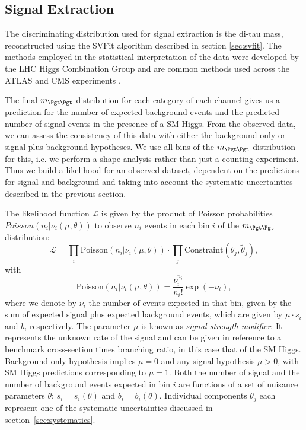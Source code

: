 \subsection{Signal Extraction}
\label{sec:signalextraction}

The discriminating distribution used for signal extraction is the di-tau mass,
reconstructed using the SVFit algorithm described in section \ref{sec:svfit}. 
The methods employed in the statistical
interpretation of the data were developed by the LHC Higgs Combination Group and
are common methods used across the ATLAS and CMS experiments \cite{LHC-HCG-Report}.

The final $m_{\Pgt\Pgt}$ distribution for each category of each channel gives
us a prediction for the number of expected background events and the predicted number of signal
events in the presence of a \ac{SM} Higgs. From the observed data, we can assess
the consistency of this data with either the background only or
signal-plus-background hypotheses. We use all bins of the $m_{\Pgt\Pgt}$
distribution for this, i.e. we perform a shape analysis rather than just a
counting experiment. Thus we build a likelihood for an observed dataset,
dependent on the predictions for signal and background and taking into account
the systematic uncertainties described in the previous section.

The likelihood function $\mathcal{L}$ is given by the product of Poisson probabilities 
$Poisson(n_{i} \vert \nu_{i}(\mu, \theta))$ to observe $n_{i}$ events in each bin
$i$ of the $m_{\Pgt\Pgt}$ distribution:
\begin{equation}
\mathcal{L} = \prod_{i} \mathrm{Poisson}(n_{i} \vert \nu_{i}(\mu, \theta)) \cdot
\prod_{j} \mathrm{Constraint}(\theta_{j}, \tilde{\theta}_{j}),
\label{eq:LikelihoodFunction}
\end{equation}
with
\begin{equation}
\mathrm{Poisson} ( n_{i} \vert \nu_{i}(\mu, \theta )) = \frac{\nu_{i}^{n_{i}}}{n_{i}!} \exp ( -\nu_{i} ),
\label{eq:PoissonDistribution}
\end{equation}
where we denote by $\nu_{i}$ the number of events expected in that bin,
given by the sum of expected signal plus expected background events,
which are given by $\mu \cdot s_{i}$ and $b_{i}$ respectively.
The parameter $\mu$ is known as \emph{signal strength modifier}. 
It represents the unknown rate of the signal and can be given in reference to a
benchmark cross-section times branching ratio, in this case that of the \ac{SM}
Higgs. Background-only hypothesis implies $\mu = 0$ and any signal hypothesis $
\mu > 0$, with \ac{SM} Higgs predictions corresponding to $\mu = 1$.
Both the number of signal and the number of background events expected in bin $i$ 
are functions of a set of nuisance parameters $\theta$:
$s_{i} = s_{i} ( \theta )$ and $b_{i} = b_{i} ( \theta )$.
Individual components $\theta_{j}$ each represent one of the systematic uncertainties
discussed in section~\ref{sec:systematics}.

